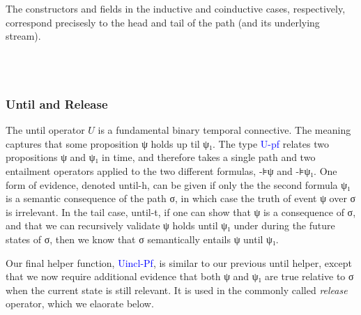 \documentclass[a4paper, 11pt]{article}
\newcommand{\blue}[1]{\textcolor{blue}{#1}}
\newcommand{\green}[1]{\textcolor{hooker\'sgreen}{#1}}
\begin{document}
The constructors and fields in the inductive and coinductive cases,
respectively, correspond precisesly to the head and tail of the path (and its
underlying stream).


\begin{code}%
%
\>[2]\AgdaSpace{}%
\AgdaSpace{}%
\AgdaSymbol{(}\AgdaSpace{}%
\AgdaSymbol{:}\AgdaSpace{}%
\AgdaSpace{}%
\AgdaSpace{}%
\AgdaSymbol{)}\AgdaSpace{}%
\AgdaSymbol{(}\AgdaSpace{}%
\AgdaSymbol{:}\AgdaSpace{}%
\AgdaSymbol{)}\AgdaSpace{}%
\AgdaSymbol{:}\AgdaSpace{}%
\AgdaSpace{}%
\<%
\\
\>[2][@{}l@{\AgdaIndent{0}}]%
\>[4]\AgdaSpace{}%
\AgdaSymbol{:}\AgdaSpace{}%
\AgdaSpace{}%
\AgdaSpace{}%
\AgdaSpace{}%
\AgdaSpace{}%
\AgdaSpace{}%
\<%
\\
%
\>[4]\AgdaSpace{}%
\AgdaSymbol{:}\AgdaSpace{}%
\AgdaSpace{}%
\AgdaSpace{}%
\AgdaSymbol{(}\AgdaSpace{}%
\AgdaSymbol{)}\AgdaSpace{}%
\AgdaSymbol{->}\AgdaSpace{}%
\AgdaSpace{}%
\AgdaSpace{}%
\<%
\end{code}

\subsubsection{Until and Release}

The until operator $U$ is a fundamental binary temporal connective. The meaning
captures that some proposition ψ holds up til ψ₁. The type \blue{U-pf} relates
two propositions ψ and ψ₁ in time, and therefore takes a single path and two
entailment operators applied to the two different formulas, -⊧ψ and -⊧ψ₁. One
form of evidence, denoted \green{until-h}, can be given if only the the second
formula ψ₁ is a semantic consequence of the path σ, in which case the truth of
event ψ over σ is irrelevant. In the tail case, \green{until-t}, if one can show
that ψ is a consequence of σ, and that we can recursively validate ψ holds until
ψ₁ under during the future states of σ, then we know that σ semantically
entails ψ until ψ₁.

Our final helper function, \blue{Uincl-Pf}, is similar to our previous until
helper, except that we now require additional evidence that both ψ and ψ₁ are
true relative to σ when the current state is still relevant. It is used in the
commonly called \emph{release} operator, which we elaorate below.
\end{document}
